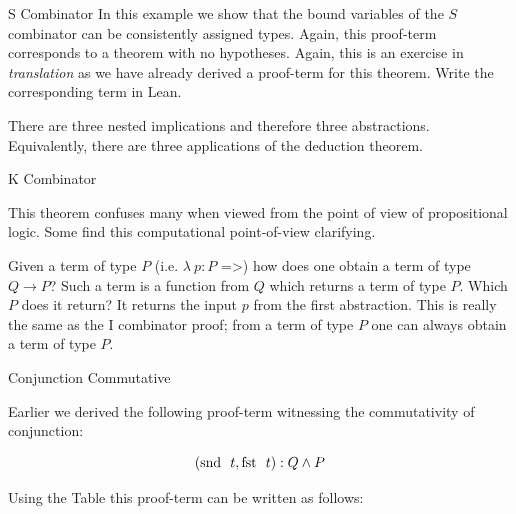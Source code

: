 \documentclass{book}
\begin{document}
    \begin{eg}{S Combinator}
        In this example we show that the bound variables of the $S$ combinator can be consistently assigned types. Again, this proof-term corresponds to a theorem with no hypotheses. Again, this is an exercise in \emph{translation} as we have already derived a proof-term for this theorem. Write the corresponding term in Lean. 

%
        
        There are three nested implications and therefore three abstractions. Equivalently, there are three applications of the deduction theorem.      
    \end{eg}

    \begin{eg}{K Combinator}

        This theorem confuses many when viewed from the point of view of propositional logic. Some find this computational point-of-view clarifying. 
%
%            

        Given a term of type $P$ (i.e.  $\lambda \ p : P$ =>) how does one obtain a term of type $Q \to P$? Such a term is a function from $Q$ which returns a term of type $P$. Which $P$ does it return? It returns the input $p$ from the first abstraction. This is really the same as the I combinator proof; from a term of type $P$ one can always obtain a term of type $P$.
    \end{eg}

    \begin{eg}{Conjunction Commutative}

        Earlier we derived the following proof-term witnessing the commutativity of conjunction:

        $$ (\text{snd } \ t, \text{fst } \ t) : Q \land P $$

        Using the Table this proof-term can be written as follows:
%
%
    \end{eg}
\end{document}
